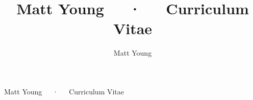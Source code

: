 \documentclass[11pt, a4paper]{cv}
\author{Matt Young}
\title{Matt Young~~~·~~~Curriculum Vitae}
\begin{document}


\makecvfooter{\today}
{Matt Young~~~·~~~Curriculum Vitae}
{\thepage}





\newpage




\end{document}
